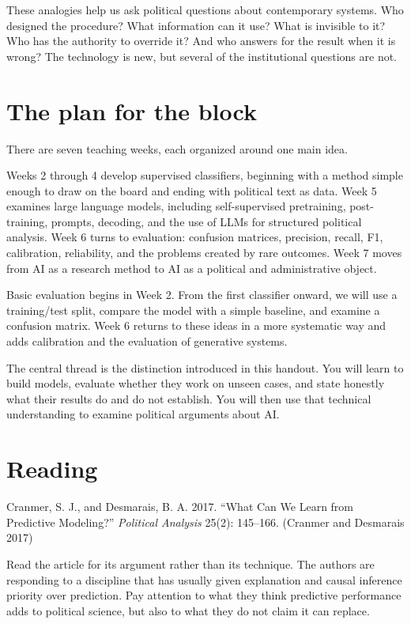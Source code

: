 \documentclass[
  a4paper,
]{scrbook}
\begin{document}
These analogies help us ask political questions about contemporary
systems. Who designed the procedure? What information can it use? What
is invisible to it? Who has the authority to override it? And who
answers for the result when it is wrong? The technology is new, but
several of the institutional questions are not.

\section{The plan for the block}\label{the-plan-for-the-block}

There are seven teaching weeks, each organized around one main idea.

Weeks 2 through 4 develop supervised classifiers, beginning with a
method simple enough to draw on the board and ending with political text
as data. Week 5 examines large language models, including
self-supervised pretraining, post-training, prompts, decoding, and the
use of LLMs for structured political analysis. Week 6 turns to
evaluation: confusion matrices, precision, recall, F1, calibration,
reliability, and the problems created by rare outcomes. Week 7 moves
from AI as a research method to AI as a political and administrative
object.

Basic evaluation begins in Week 2. From the first classifier onward, we
will use a training/test split, compare the model with a simple
baseline, and examine a confusion matrix. Week 6 returns to these ideas
in a more systematic way and adds calibration and the evaluation of
generative systems.

The central thread is the distinction introduced in this handout. You
will learn to build models, evaluate whether they work on unseen cases,
and state honestly what their results do and do not establish. You will
then use that technical understanding to examine political arguments
about AI.

\section{Reading}\label{reading}

Cranmer, S. J., and Desmarais, B. A. 2017. ``What Can We Learn from
Predictive Modeling?'' \emph{Political Analysis} 25(2): 145--166.
(Cranmer and Desmarais 2017)

Read the article for its argument rather than its technique. The authors
are responding to a discipline that has usually given explanation and
causal inference priority over prediction. Pay attention to what they
think predictive performance adds to political science, but also to what
they do not claim it can replace.
\end{document}

